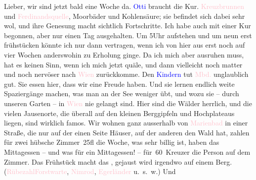 \pstart
           Lieber, wir sind jetzt bald eine Woche da. \textcolor{blue}{Otti}{}\ledrightnote{\textcolor{blue}{Ottilie Salten}} braucht die Kur. \textcolor{pink}{Kreuzbrunnen}{}\ledrightnote{\textcolor{pink}{Kreuzbrunnen}} und \textcolor{pink}{Ferdinandsquelle}{}\ledrightnote{\textcolor{pink}{Ferdinandquelle}},
               Moorbäder und Kohlensäure; sie befindet sich dabei sehr wol, und ihre Genesung macht
               sichtlich Fortschritte. Ich habe auch mit einer Kur begonnen, aber nur einen Tag
               ausgehalten. Um 5Uhr aufstehen und um neun erst frühstücken
               könnte ich nur dann vertragen, wenn ich von hier aus erst noch auf vier Wochen
               anderswohin zu Erholung ginge. Da ich mich aber ausruhen muss, hat es keinen Sinn,
               wenn ich mich jetzt quäle, und dann vielleicht noch matter und noch nervöser nach \textcolor{pink}{Wien}{}\ledrightnote{\textcolor{pink}{Wien}} zurückkomme. Den \textcolor{blue}{Kindern}{}\ledrightnote{{$\rightarrow$}\textcolor{blue}{Paul Salten}{\newline}{$\rightarrow$}\textcolor{blue}{Anna Katharina Rehmann}} tut \textcolor{pink}{Mbd.}{}\ledrightnote{\textcolor{pink}{Marienbad}} unglaublich gut. Sie essen hier, dass wir eine Freude
               haben. Und sie lernen endlich weite Spaziergänge machen, was man an der See weniger
               übt, und wozu sie – durch unseren Garten – in \textcolor{pink}{Wien}{}\ledrightnote{\textcolor{pink}{Wien}}
               nie gelangt sind. Hier sind die Wälder herrlich, und die vielen Jausenorte, die
               überall auf den kleinen Berggipfeln und Hochplateaus liegen, sind wirklich famos. Wir
               wohnen ganz ausserhalb von \textcolor{pink}{Marienbad}{}\ledrightnote{\textcolor{pink}{Marienbad}} in einer
               Straße, die nur auf der einen Seite Häuser, auf der anderen den Wald hat, zahlen für
               zwei hübsche Zimmer 25fl die Woche, was sehr billig ist, haben das Mittagessen – und
               was für ein Mittagessen! – für 60 Kreuzer die Person auf dem Zimmer. Das Frühstück
               macht das \label{K_L03510-1v}\label{K_L03510-1h}, gejaust wird
               irgendwo auf einem Berg. (\textcolor{pink}{Rübezahl}{}\ledrightnote{\textcolor{pink}{Hotel Rübezahl}}{ }\textcolor{pink}{Forstwarte}{}\ledrightnote{\textcolor{pink}{Café Forstwarte}}, \textcolor{pink}{Nimrod}{}\ledrightnote{\textcolor{pink}{Café Nimrod}}, \textcolor{pink}{Egerländer}{}\ledrightnote{\textcolor{pink}{Café Egerländer}} u. s. w.) Und

